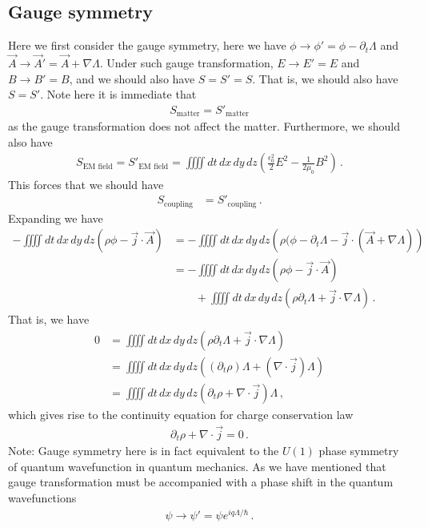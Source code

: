 \documentclass[11pt, onesided]{book}
\theoremstyle{break}
\theoremstyle{break}
\newcommand{\pd}{\partial}
\newcommand{\note}{\color{red}Note: \color{black}}
\begin{document}
\subsection*{Gauge symmetry}
Here we first consider the gauge symmetry, here we have $\phi \to \phi' = \phi - \pd_t \Lambda$ and $\vec{A} \to \vec{A}' = \vec{A} + \nabla \Lambda$. Under such gauge transformation, $E \to E' = E$ and $B \to B' = B$, and we should also have $S = S' = S$. That is, we should also have $S = S'$. Note here it is immediate that
\begin{align*}
S_{\text{matter}} = S'_{\text{matter}}
\end{align*}
as the gauge transformation does not affect the matter. Furthermore, we should also have
\begin{align*}
S_{\text{EM field}} = S'_{\text{EM field}} = \iiiint dt\,dx\,dy\,dz \left( \frac{\epsilon_0^2}{2}E^2 - \frac{1}{2\mu_0}B^2\right)\,.
\end{align*}
This forces that we should have
\begin{align*}
S_{\text{coupling}} &= S'_{\text{coupling}}\,.
\end{align*}
Expanding we have
\begin{align*}
-\iiiint dt\,dx\,dy\,dz\left( \rho \phi - \vec{j}\cdot \vec{A}\right) &= -\iiiint dt\,dx\,dy\, dz\left( \rho (\phi - \pd_t\Lambda - \vec{j}\cdot (\vec{A} + \nabla \Lambda)\right)\\
&= 
-\iiiint dt\,dx\,dy\,dz\left( \rho \phi - \vec{j}\cdot \vec{A}\right) \\
&{}\qquad + \iiiint dt\,dx\,dy\,dz\left( \rho \pd_t \Lambda  + \vec{j}\cdot \nabla \Lambda\right)\,.
\end{align*}
That is, we have
\begin{align*}
0 
&= \iiiint dt\,dx\,dy\,dz\left( \rho \pd_t \Lambda  + \vec{j}\cdot \nabla \Lambda\right)\\
&= \iiiint dt\,dx\,dy\,dz\left( (\pd_t\rho)  \Lambda  + (\nabla \cdot\vec{j}) \Lambda\right)\\
&= \iiiint dt\,dx\,dy\,dz\left( \pd_t\rho  + \nabla \cdot\vec{j} \right)\Lambda\,,
\end{align*}
which gives rise to the continuity equation for charge conservation law
\begin{align*}
\pd_t \rho  + \nabla \cdot \vec{j} = 0\,.
\end{align*}
\note Gauge symmetry here is in fact equivalent to the $U(1)$ phase symmetry of quantum wavefunction in quantum mechanics. As we have mentioned that gauge transformation must be accompanied with a phase shift in the quantum wavefunctions
\begin{align*}
\psi \to \psi' = \psi e^{iq\Lambda/\hbar}\,.
\end{align*} 
\end{document}
